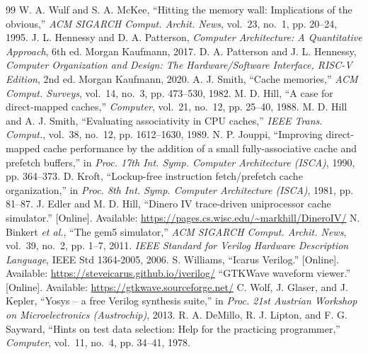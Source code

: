 \documentclass[conference]{IEEEtran}
\begin{document}
\begin{thebibliography}{99}
 W. A. Wulf and S. A. McKee, ``Hitting the memory wall: Implications of the obvious,'' \emph{ACM SIGARCH Comput. Archit. News}, vol.~23, no.~1, pp. 20--24, 1995.
 J. L. Hennessy and D. A. Patterson, \emph{Computer Architecture: A Quantitative Approach}, 6th ed. Morgan Kaufmann, 2017.
 D. A. Patterson and J. L. Hennessy, \emph{Computer Organization and Design: The Hardware/Software Interface, RISC-V Edition}, 2nd ed. Morgan Kaufmann, 2020.
 A. J. Smith, ``Cache memories,'' \emph{ACM Comput. Surveys}, vol.~14, no.~3, pp. 473--530, 1982.
 M. D. Hill, ``A case for direct-mapped caches,'' \emph{Computer}, vol.~21, no.~12, pp. 25--40, 1988.
 M. D. Hill and A. J. Smith, ``Evaluating associativity in CPU caches,'' \emph{IEEE Trans. Comput.}, vol.~38, no.~12, pp. 1612--1630, 1989.
 N. P. Jouppi, ``Improving direct-mapped cache performance by the addition of a small fully-associative cache and prefetch buffers,'' in \emph{Proc. 17th Int. Symp. Computer Architecture (ISCA)}, 1990, pp. 364--373.
 D. Kroft, ``Lockup-free instruction fetch/prefetch cache organization,'' in \emph{Proc. 8th Int. Symp. Computer Architecture (ISCA)}, 1981, pp. 81--87.
 J. Edler and M. D. Hill, ``Dinero IV trace-driven uniprocessor cache simulator.'' [Online]. Available: \url{https://pages.cs.wisc.edu/~markhill/DineroIV/}
 N. Binkert \emph{et al.}, ``The gem5 simulator,'' \emph{ACM SIGARCH Comput. Archit. News}, vol.~39, no.~2, pp. 1--7, 2011.
 \emph{IEEE Standard for Verilog Hardware Description Language}, IEEE Std 1364-2005, 2006.
 S. Williams, ``Icarus Verilog.'' [Online]. Available: \url{https://steveicarus.github.io/iverilog/}
 ``GTKWave waveform viewer.'' [Online]. Available: \url{https://gtkwave.sourceforge.net/}
 C. Wolf, J. Glaser, and J. Kepler, ``Yosys -- a free Verilog synthesis suite,'' in \emph{Proc. 21st Austrian Workshop on Microelectronics (Austrochip)}, 2013.
 R. A. DeMillo, R. J. Lipton, and F. G. Sayward, ``Hints on test data selection: Help for the practicing programmer,'' \emph{Computer}, vol.~11, no.~4, pp. 34--41, 1978.
\end{thebibliography}
\end{document}
